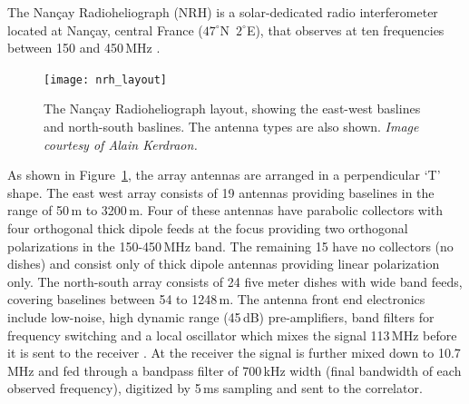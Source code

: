 The Nan\c{c}ay Radioheliograph (NRH) is a solar-dedicated radio interferometer located at Nan\c{c}ay, central France ($47^{\circ}$N~$2^{\circ}$E), that observes at ten frequencies between 150 and 450\,MHz \citep{kerdraon1997}.
\begin{figure}
\centering
\texttt{[image: nrh\_layout]}
\caption[The Nan\c{c}ay Radioheliograph layout]{The Nan\c{c}ay Radioheliograph layout, showing the east-west baslines and north-south baslines. The antenna types are also shown. {\it Image courtesy of Alain Kerdraon.}}
\label{fig:nrh_layout}
\end{figure}
As shown in Figure~\ref{fig:nrh_layout}, the array antennas are arranged in a perpendicular \textquoteleft T' shape. The east west array consists of 19 antennas providing baselines in the range of 50\,m to 3200\,m. Four of these antennas have parabolic collectors with four orthogonal thick dipole feeds at the focus providing two orthogonal polarizations in the 150-450\,MHz band. The remaining 15 have no collectors (no dishes) and consist only of thick dipole antennas providing linear polarization only. The north-south array consists of 24 five meter dishes with wide band feeds, covering baselines between 54 to 1248\,m. The antenna front end electronics include low-noise, high dynamic range (45\,dB) pre-amplifiers, band filters for frequency switching and a local oscillator which mixes the signal 113\,MHz before it is sent to the receiver \citep{avignon1989}. At the receiver the signal is further mixed down to 10.7\,MHz and fed through a bandpass filter of 700\,kHz width (final bandwidth of each observed frequency), digitized  by 5\,ms sampling and sent to the correlator.


